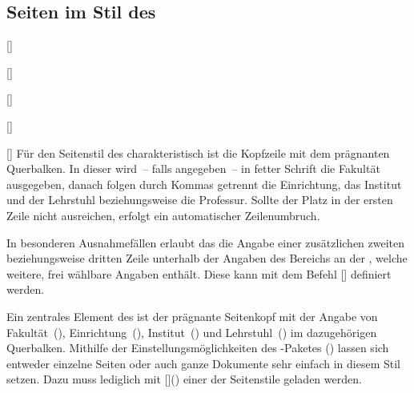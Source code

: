 \begin{Declaration*}{}
\begin{Declaration*}{}
\begin{Declaration*}{}
\subsection{Seiten im Stil des \CDs}
%
%
%
\begin{Declaration}{[]}
\begin{Declaration}{[]}
\begin{Declaration}{[]}
\begin{Declaration}{[]}
\begin{Declaration}{[]}
\printdeclarationlist%
%
%
Für den Seitenstil des \TUDCDs charakteristisch ist die Kopfzeile mit dem 
prägnanten Querbalken. In dieser wird~-- falls angegeben~-- in fetter Schrift 
die Fakultät ausgegeben, danach folgen durch Kommas getrennt die Einrichtung, 
das Institut und der Lehrstuhl beziehungsweise die Professur. Sollte der Platz 
in der ersten Zeile nicht ausreichen, erfolgt ein automatischer Zeilenumbruch.

In besonderen Ausnahmefällen erlaubt das \CD die Angabe einer zusätzlichen
zweiten beziehungsweise dritten Zeile unterhalb der Angaben des Bereichs an der 
\TnUD, welche weitere, frei wählbare Angaben enthält. Diese kann mit dem Befehl 
[] definiert werden.
\end{Declaration}
\end{Declaration}
\end{Declaration}
\end{Declaration}
\end{Declaration}
%
\begin{Declaration}[v2.02]{}
\begin{Declaration}[v2.02]{}
\begin{Declaration}[v2.02]{}
\printdeclarationlist%
%
%
%
%
Ein zentrales Element des \TUDCDs ist der prägnante Seitenkopf mit der Angabe 
von Fakultät~(), Einrichtung~(), 
Institut~() und Lehrstuhl~() im dazugehörigen 
Querbalken. Mithilfe der Einstellungsmöglichkeiten des \KOMAScript-Paketes 
() lassen sich entweder einzelne 
Seiten oder auch ganze Dokumente sehr einfach in diesem Stil setzen. Dazu muss 
lediglich mit []() 
einer der Seitenstile geladen werden. 


\end{Declaration}
\end{Declaration}
\end{Declaration}
\end{Declaration*}
\end{Declaration*}
\end{Declaration*}
